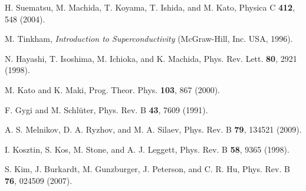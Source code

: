 \documentclass[aps,prl,showpacs,twocolumn]{revtex4}
\begin{document}
\begin{thebibliography}{99}
 H. Suematsu, M. Machida, T. Koyama, T. Ishida, and M. Kato, Physica C {\bf 412},
548 (2004).

 M. Tinkham, \emph{Introduction to Superconductivity} (McGraw-Hill, Inc. USA,
1996).

 N. Hayashi, T. Isoshima, M. Ichioka, and K. Machida, Phys. Rev. Lett. {\bf 80}, 2921
(1998).

 M. Kato and K. Maki, Prog. Theor. Phys. {\bf 103}, 867
(2000).

 F. Gygi and M. Schl\"{u}ter, Phys. Rev. B {\bf 43}, 7609
(1991).

 A. S. Melnikov, D. A. Ryzhov, and M. A. Silaev, Phys. Rev. B {\bf 79}, 134521
(2009).

 I. Kosztin, S. Kos, M. Stone, and A. J. Leggett, Phys. Rev. B {\bf 58}, 9365
(1998).

 S. Kim, J. Burkardt, M. Gunzburger, J. Peterson, and C. R. Hu, Phys. Rev. B {\bf 76}, 024509 (2007).




\end{thebibliography}
\end{document}
